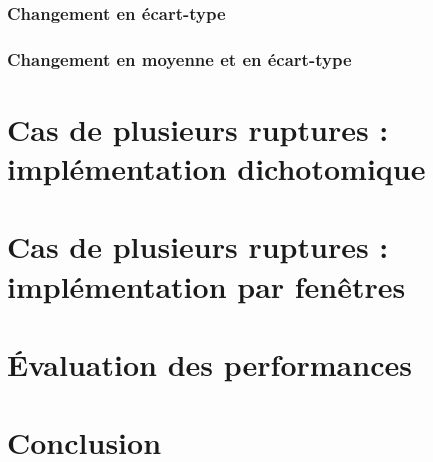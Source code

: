 \documentclass[french,12pt,notitlepage]{report}
\begin{document}
	\subsection{Changement en écart-type}
	
	\subsection{Changement en moyenne et en écart-type}
	
	\chapter{Cas de plusieurs ruptures : implémentation dichotomique}
	
	\chapter{Cas de plusieurs ruptures : implémentation par fenêtres}
	
	\chapter{Évaluation des performances}
	
	\chapter{Conclusion}
\end{document}
